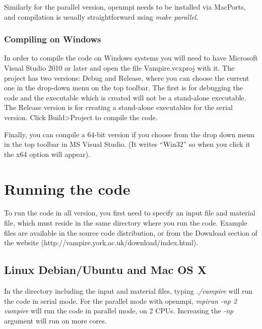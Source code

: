 Similarly for the parallel version, openmpi needs to be installed via MacPorts, and compilation is usually straightforward using \textit{make parallel}.

\subsection*{Compiling on Windows}
In order to compile the code on Windows systems you will need to have Microsoft Visual Studio 2010 or later and open the file  Vampire.vcxproj with it. The project has two versions: Debug and Release, where you can choose the current one in the drop-down menu on the top toolbar. The first is for debugging the code and the executable which is created will not be a stand-alone executable. The Release version is for creating a stand-alone executables for the serial version. Click Build>Project to compile the code.

Finally, you can compile a 64-bit version if you choose from the drop down menu in the top toolbar in MS Visual Studio. (It writes ``Win32'' so when you click it the x64 option will appear).


%
%
%
%
\chapter{Running the code}
To run the code in all version, you first need to specify an input file and material file, which must reside in the same directory where you run the code. Example files are available in the source code distribution, or from the Download section of the website (http://vampire.york.ac.uk/download/index.html).

\section*{Linux Debian/Ubuntu and Mac OS X}
In the directory including the input and material files, typing \textit{./vampire} will run the code in serial mode. For the parallel mode with openmpi, \textit{mpirun -np 2 vampire} will run the code in parallel mode, on 2 CPUs. Increasing the \textit{-np} argument will run on more cores.

